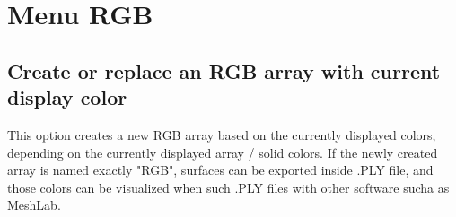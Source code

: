 
\chapter{Menu RGB}
\minitoc 

\section{Create or replace an RGB array with current display color}
This option creates a new RGB array based on the currently displayed colors, depending on the currently displayed array / solid colors. If the newly created array is named exactly "RGB", surfaces can be exported inside .PLY  file, and those colors can be visualized when such .PLY files with other software sucha as MeshLab.